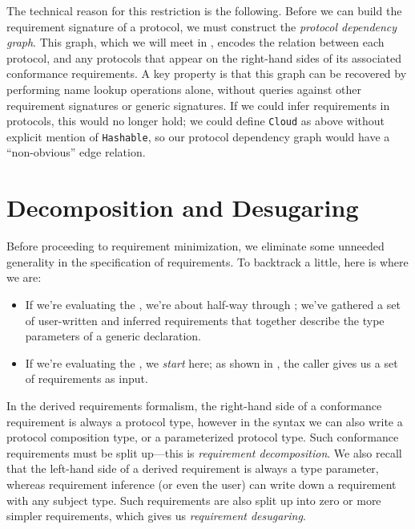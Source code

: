 \documentclass[../generics]{subfiles}
\begin{document}
The technical reason for this restriction is the following. Before we can build the requirement signature of a protocol, we must construct the \emph{protocol dependency graph}. This graph, which we will meet in , encodes the relation between each protocol, and any protocols that appear on the right-hand sides of its associated conformance requirements. A key property is that this graph can be recovered by performing name lookup operations alone, without queries against other requirement signatures or generic signatures. If we could infer requirements in protocols, this would no longer hold; we could define \texttt{Cloud} as above without explicit mention of \texttt{Hashable}, so our protocol dependency graph would have a ``non-obvious'' edge relation.

\section{Decomposition and Desugaring}\label{requirement desugaring}

Before proceeding to requirement minimization, we eliminate some unneeded generality in the specification of requirements. To backtrack a little, here is where we are:
\begin{itemize}
\item If we're evaluating the , we're about half-way through ; we've gathered a set of user-written and inferred requirements that together describe the type parameters of a generic declaration.
\item  If we're evaluating the , we \emph{start} here; as shown in , the caller gives us a set of requirements as input.
\end{itemize}
In the derived requirements formalism, the right-hand side of a conformance requirement is always a protocol type, however in the syntax we can also write a protocol composition type, or a parameterized protocol type. Such conformance requirements must be split up---this is \emph{requirement decomposition}. We also recall that the left-hand side of a derived requirement is always a type parameter, whereas requirement inference (or even the user) can write down a requirement with any subject type. Such requirements are also split up into zero or more simpler requirements, which gives us \emph{requirement desugaring}.
\end{document}
